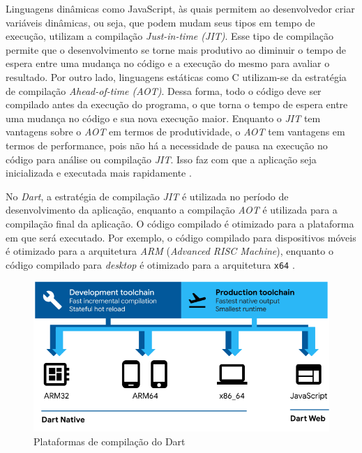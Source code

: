 Linguagens dinâmicas como JavaScript, às quais permitem ao desenvolvedor criar variáveis dinâmicas, ou seja, que podem mudam seus tipos em tempo de execução, utilizam a compilação \textit{Just-in-time (JIT)}. Esse tipo de compilação permite que o desenvolvimento se torne mais produtivo ao diminuir o tempo de espera entre uma mudança no código e a execução do mesmo para avaliar o resultado. Por outro lado, linguagens estáticas como C utilizam-se da estratégia de compilação \textit{Ahead-of-time (AOT)}. Dessa forma, todo o código deve ser compilado antes da execução do programa, o que torna o tempo de espera entre uma mudança no código e sua nova execução maior. Enquanto o \textit{JIT} tem vantagens sobre o \textit{AOT} em termos de produtividade, o \textit{AOT} tem vantagens em termos de performance, pois não há a necessidade de pausa na execução no código para análise ou compilação \textit{JIT}. Isso faz com que a aplicação seja inicializada e executada mais rapidamente \cite{leler2017flutterdart}.

No \textit{Dart}, a estratégia de compilação \textit{JIT} é utilizada no período de desenvolvimento da aplicação, enquanto a compilação \textit{AOT} é utilizada para a compilação final da aplicação. O código compilado é otimizado para a plataforma em que será executado. Por exemplo, o código compilado para dispositivos móveis é otimizado para a arquitetura \textit{ARM} (\textit{Advanced RISC Machine}), enquanto o código compilado para \textit{desktop} é otimizado para a arquitetura \texttt{x64} \cite{dart-platforms}.

\begin{figure}[!ht]
  \includegraphics[width=1\textwidth, keepaspectratio=true]{figuras/cap2/2_1_2_dart-platforms.png}
  \centering
  \caption[Plataformas de compilação do Dart]{Plataformas de compilação do Dart \protect\cite{dart-platforms}}
  \label{fig:dart_plataforms}
\end{figure}


